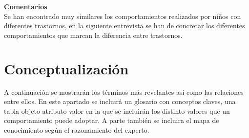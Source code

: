 \documentclass[letterpaper,12pt]{article}
\begin{document}
\begin{flushleft}
\textbf{Comentarios} \\
Se han encontrado muy similares los comportamientos realizados por niños
con diferentes trastornos, en la siguiente entrevista se han de concretar los
diferentes comportamientos que marcan la diferencia entre trastornos.\\
\end{flushleft}

\newpage
\section{Conceptualización}
A continuación se mostrarán los términos más revelantes así como las
relaciones entre ellos. En este apartado se incluirá un glosario con conceptos claves, una tabla objeto-atributo-valor en la que se incluirán los distinto valores que un comportamiento puede adoptar. A parte también se incluira el mapa de conocimiento según el razonamiento del experto.
\end{document}
